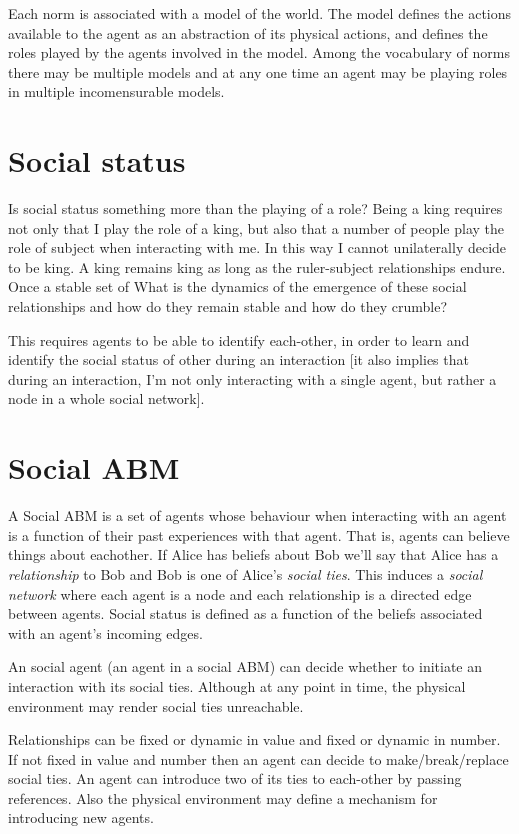 \documentclass[a4paper]{article}
\begin{document}
Each norm is associated with a model of the world. The model defines the actions available to the agent as an abstraction of its physical actions, and defines the roles played by the agents involved in the model. Among the vocabulary of norms there may be multiple models and at any one time an agent may be playing roles in multiple incomensurable models. 

\section{Social status}

Is social status something more than the playing of a role? Being a king requires not only that I play the role of a king, but also that a number of people play the role of subject when interacting with me. In this way I cannot unilaterally decide to be king. A king remains king as long as the ruler-subject relationships endure. Once a stable set of   What is the dynamics of the emergence of these social relationships and how do they remain stable and how do they crumble? 

This requires agents to be able to identify each-other, in order to learn and identify the social status of other during an interaction [it also implies that during an interaction, I'm not only interacting with a single agent, but rather a node in a whole social network].

\section{Social ABM}

A Social ABM is a set of agents whose behaviour when interacting with an agent is a function of their past experiences with that agent. That is, agents can believe things about eachother. If Alice has beliefs about Bob we'll say that Alice has a \textit{relationship} to Bob and Bob is one of Alice's \textit{social ties}. This induces a \textit{social network} where each agent is a node and each relationship is a directed edge between agents. Social status is defined as a function of the beliefs associated with an agent's incoming edges. 

An social agent (an agent in a social ABM) can decide whether to initiate an interaction with its social ties. Although at any point in time, the physical environment may render social ties unreachable.

Relationships can be fixed or dynamic in value and fixed or dynamic in number. If not fixed in value and number then an agent can decide to make/break/replace social ties. An agent can introduce two of its ties to each-other by passing references. Also the physical environment may define a mechanism for introducing new agents.
\end{document}
